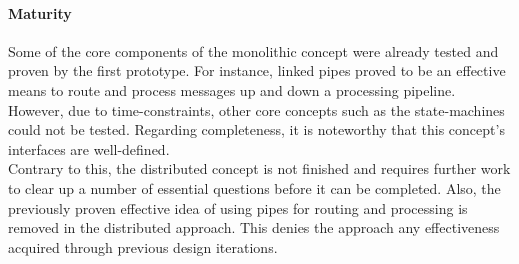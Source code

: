 \paragraph{Maturity}
Some of the core components of the monolithic concept were already tested and proven by the first prototype. For instance, linked pipes proved to be an effective means to route and process messages up and down a processing pipeline. However, due to time-constraints, other core concepts such as the state-machines could not be tested. Regarding completeness, it is noteworthy that this concept's interfaces are well-defined.\\
Contrary to this, the distributed concept is not finished and requires further work to clear up a number of essential questions before it can be completed. Also, the previously proven effective idea of using pipes for routing and processing is removed in the distributed approach. This denies the approach any effectiveness acquired through previous design iterations.